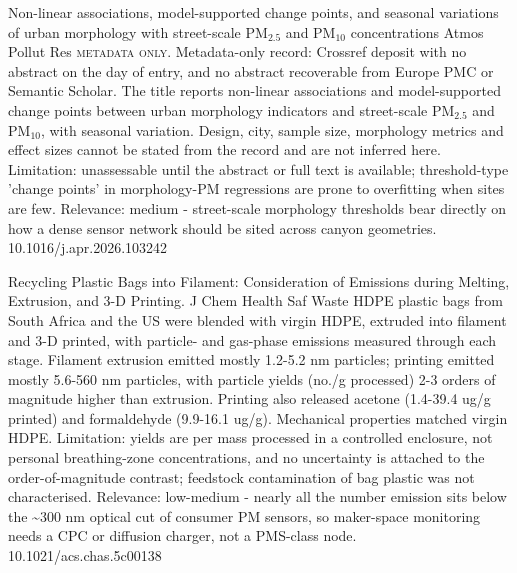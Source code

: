 \documentclass[10pt]{article}
\begin{document}
\par{}\baselineskip{}\baselineskip
{}

{Non-linear associations, model-supported change points, and seasonal variations of urban morphology with street-scale PM$_{2.5}$ and PM$_{10}$ concentrations}
{Atmos Pollut Res}
{\textsc{metadata only.} Metadata-only record: Crossref deposit with no abstract on the day of entry, and no abstract recoverable from Europe PMC or Semantic Scholar. The title reports non-linear associations and model-supported change points between urban morphology indicators and street-scale PM$_{2.5}$ and PM$_{10}$, with seasonal variation. Design, city, sample size, morphology metrics and effect sizes cannot be stated from the record and are not inferred here. Limitation: unassessable until the abstract or full text is available; threshold-type 'change points' in morphology-PM regressions are prone to overfitting when sites are few. Relevance: medium - street-scale morphology thresholds bear directly on how a dense sensor network should be sited across canyon geometries.}
{10.1016/j.apr.2026.103242}

\par{}\baselineskip{}\baselineskip
{}

{Recycling Plastic Bags into Filament: Consideration of Emissions during Melting, Extrusion, and 3-D Printing.}
{J Chem Health Saf}
{Waste HDPE plastic bags from South Africa and the US were blended with virgin HDPE, extruded into filament and 3-D printed, with particle- and gas-phase emissions measured through each stage. Filament extrusion emitted mostly 1.2-5.2 nm particles; printing emitted mostly 5.6-560 nm particles, with particle yields (no./g processed) 2-3 orders of magnitude higher than extrusion. Printing also released acetone (1.4-39.4 ug/g printed) and formaldehyde (9.9-16.1 ug/g). Mechanical properties matched virgin HDPE. Limitation: yields are per mass processed in a controlled enclosure, not personal breathing-zone concentrations, and no uncertainty is attached to the order-of-magnitude contrast; feedstock contamination of bag plastic was not characterised. Relevance: low-medium - nearly all the number emission sits below the \textasciitilde{}300 nm optical cut of consumer PM sensors, so maker-space monitoring needs a CPC or diffusion charger, not a PMS-class node.}
{10.1021/acs.chas.5c00138}
\end{document}
